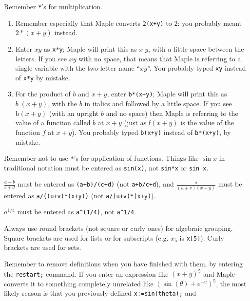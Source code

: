 \documentclass{amsart}
\begin{document}
\begin{secenum}
%
 \item\label{rememberstar} Remember \verb~*~'s for multiplication.  
  \begin{enumerate}
   \item Remember especially that Maple converts
    \verb~2(x+y)~ to $2$: you probably meant $2*(x+y)$
    instead. 
   \item Enter $xy$ as \verb~x*y~; Maple will print this as
    $x\;y$, with a little space between the letters.  If you
    see $xy$ with no space, that means that Maple is
    referring to a single variable with the two-letter name
    ``$xy$''.  You probably typed \verb~xy~ instead of
    \verb~x*y~ by mistake. 
   \item For the product of $b$ and $x+y$, enter
    \verb~b*(x+y)~; Maple will print this as $b\;(x+y)$,
    with the $b$ in italics and followed by a little space. 
    If you see $\text{b}(x+y)$ (with an upright $b$ and no
    space) then Maple is referring to the value of a
    function called $b$ at $x+y$ (just as $\text{f}(x+y)$ is
    the value of the function $f$ at $x+y$).  You probably
    typed \verb~b(x+y)~ instead of \verb~b*(x+y)~, by
    mistake. 
  \end{enumerate}
%
 \item\label{nostar} Remember not to use \verb~*~'s for application of
  functions. Things like $\sin x$ in traditional notation
  must be entered as \verb~sin(x)~, not \verb~sin*x~ or
  \verb~sin x~. 
%
 \item\label{fracbrac} $\frac{a+b}{c+d}$ must be entered as
  \verb~(a+b)/(c+d)~ (not \verb~a+b/c+d~), and
   $\frac{a}{(u+v)(x+y)}$ must be entered as
   \verb~a/((u+v)*(x+y))~ (not \verb~a/(u+v)*(x+y)~). 
%
 \item\label{expbrac} $a^{1/4}$ must be entered as \verb~a^(1/4)~, not
         \verb~a^1/4~. 
%
 \item\label{shape} Always use round brackets (not square or curly
         ones) for algebraic grouping.  Square brackets are
         used for lists or for subscripts (e.g. $x_5$ is
         \verb~x[5]~).  Curly brackets are used for sets. 
%
 \item\label{removedefs} Remember to remove definitions when you
  have finished with 
  them, by entering the \verb~restart;~ command.  If you
  enter an expression like $(x+y)^5$ and Maple converts it
  to something completely unrelated like
  $(\sin(\theta)+e^{-u})^5$, the most likely reason is that
  you previously defined \verb~x:=sin(theta);~ and

\end{secenum}
\end{document}
